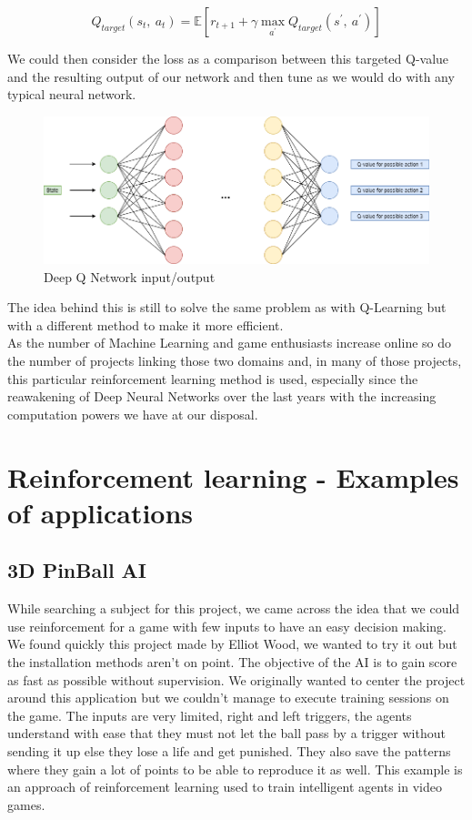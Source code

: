 \documentclass[a4paper,12pt,calibri,oneside,openany]{book}
\theoremstyle{break}
\begin{document}
$$
Q_{target} (s_t,\ a_t)=\mathbb{E}\left[ r_{t+1}+\gamma \max_{a^{'}} Q_{target}(s^{'},\ a^{'}) \right] 
$$

We could then consider the loss as a comparison between this targeted Q-value and the resulting output of our network and then tune as we would do with any typical neural network.\\

\begin{figure}[H]
	\centering\includegraphics[width=\linewidth]{DQN}
	\caption{Deep Q Network input/output}
\end{figure}

The idea behind this is still to solve the same problem as with Q-Learning but with a different method to make it more efficient.\\

As the number of Machine Learning and game enthusiasts increase online so do the number of projects linking those two domains and, in many of those projects, this particular reinforcement learning method is used, especially since the reawakening of Deep Neural Networks over the last years with the increasing computation powers we have at our disposal.


\chapter{Reinforcement learning - Examples of applications}
\section{3D PinBall AI}
\qquad While searching a subject for this project, we came across the idea that we could use reinforcement for a game with few inputs to have an easy decision making. We found quickly this project made by Elliot Wood, we wanted to try it out but the installation methods aren't on point. The objective of the AI is to gain score as fast as possible without supervision. We originally wanted to center the project around this application but we couldn't manage to execute training sessions on the game. The inputs are very limited, right and left triggers, the agents understand with ease that they must not let the ball pass by a trigger without sending it up else they lose a life and get punished. They also save the patterns where they gain a lot of points to be able to reproduce it as well. This example is an approach of reinforcement learning used to train intelligent agents in video games. 
\end{document}
